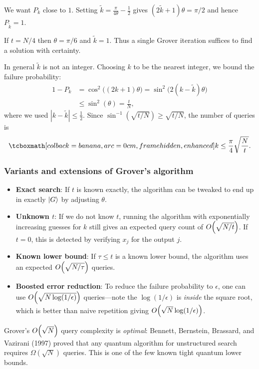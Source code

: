 We want $P_k$ close to $1$.  Setting
$\widetilde{k} = \frac{\pi}{4\theta} - \frac{1}{2}$ gives
$(2\widetilde{k}+1)\theta = \pi/2$ and hence
$P_{\widetilde{k}} = 1$.

\begin{example}[$t = N/4$]
  If $t = N/4$ then $\theta = \pi/6$ and $\widetilde{k} = 1$.
  Thus a single Grover iteration suffices to find a solution with certainty.
\end{example}

In general $\widetilde{k}$ is not an integer.  Choosing $k$ to be the
nearest integer, we bound the failure probability:
\begin{equation}
  \begin{split}
    1-P_k &= \cos^2\bigl((2k+1)\theta\bigr)
    = \sin^2\bigl(2(k-\widetilde{k})\theta\bigr) \\
    &\le \sin^2(\theta) = \frac{t}{N},
  \end{split}
\end{equation}
where we used $|k-\widetilde{k}|\le \frac{1}{2}$.  Since
$\sin^{-1}(\sqrt{t/N})\ge \sqrt{t/N}$, the number of queries is
\begin{equation}
  \eqbox{k\le \frac{\pi}{4}\sqrt{\frac{N}{t}}.}
\end{equation}

\subsubsection{Variants and extensions of Grover's algorithm}

\begin{itemize}
  \item \textbf{Exact search}: If $t$ is known exactly, the algorithm can
    be tweaked to end up in exactly $|G\rangle$ by adjusting $\theta$.

  \item \textbf{Unknown $t$}: If we do not know $t$, running the algorithm
    with exponentially increasing guesses for $k$ still gives an expected
    query count of $O\!\left(\sqrt{N/t}\right)$.  If $t=0$, this is detected by
    verifying $x_j$ for the output $j$.

  \item \textbf{Known lower bound}: If $\tau \le t$ is a known lower bound,
    the algorithm uses an expected $O\!\left(\sqrt{N/\tau}\right)$ queries.

  \item \textbf{Boosted error reduction}: To reduce the failure probability
    to $\epsilon$, one can use $O\!\left(\sqrt{N \log(1/\epsilon)}\right)$
    queries---note the $\log(1/\epsilon)$ is \emph{inside} the square root,
    which is better than naive repetition giving
    $O\!\left(\sqrt{N}\log(1/\epsilon)\right)$.
\end{itemize}

\begin{remark}
  Grover's $O\!\left(\sqrt{N}\right)$ query complexity is \emph{optimal}: Bennett,
  Bernstein, Brassard, and Vazirani (1997) proved that any quantum algorithm
  for unstructured search requires $\Omega(\sqrt{N})$ queries.  This is one
  of the few known tight quantum lower bounds.
\end{remark}
